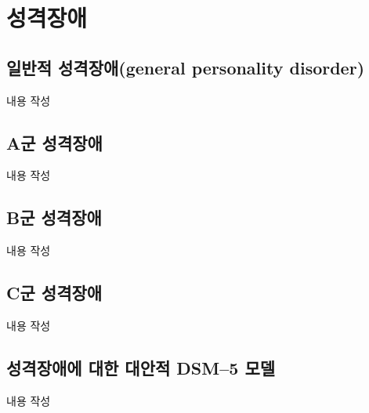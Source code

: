 \section{성격장애}

\subsection{일반적 성격장애(general personality disorder)}
내용 작성

\subsection{A군 성격장애}
내용 작성

\subsection{B군 성격장애}
내용 작성

\subsection{C군 성격장애}
내용 작성

\subsection{성격장애에 대한 대안적 DSM–5 모델}
내용 작성
